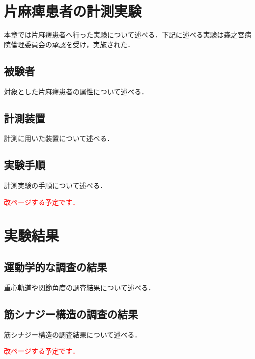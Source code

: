 \section{片麻痺患者の計測実験}
\label{sec:experiment_chap3}
本章では片麻痺患者へ行った実験について述べる．下記に述べる実験は森之宮病院倫理委員会の承認を受け，実施された．

\subsection{被験者}
\label{subsec:subject_chap3}
対象とした片麻痺患者の属性について述べる．

\subsection{計測装置}
\label{subsec:device_chap3}
計測に用いた装置について述べる．

\subsection{実験手順}
\label{subsec:method_chap3}
計測実験の手順について述べる．

\textcolor{red}{改ページする予定です．}
\section{実験結果}
\label{sec:result_chap3}

\subsection{運動学的な調査の結果}
\label{subsec:result_kinematics_chap3}
重心軌道や関節角度の調査結果について述べる．

\subsection{筋シナジー構造の調査の結果}
\label{subsec:result_synergy_chap3}
筋シナジー構造の調査結果について述べる．

\textcolor{red}{改ページする予定です．}
